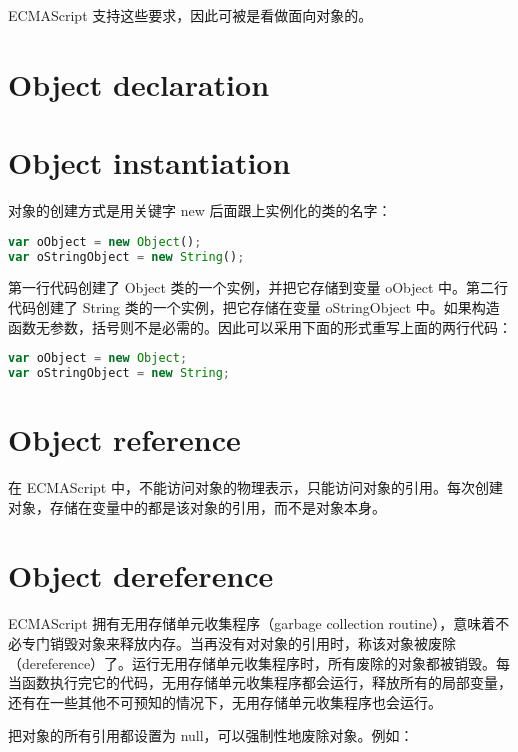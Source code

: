 ECMAScript 支持这些要求，因此可被是看做面向对象的。


\chapter{Object declaration}








\chapter{Object instantiation}


对象的创建方式是用关键字 new 后面跟上实例化的类的名字：


\begin{lstlisting}[language=JavaScript]
var oObject = new Object();
var oStringObject = new String();
\end{lstlisting}

第一行代码创建了 Object 类的一个实例，并把它存储到变量 oObject 中。第二行代码创建了 String 类的一个实例，把它存储在变量 oStringObject 中。如果构造函数无参数，括号则不是必需的。因此可以采用下面的形式重写上面的两行代码：

\begin{lstlisting}[language=JavaScript]
var oObject = new Object;
var oStringObject = new String;
\end{lstlisting}


\chapter{Object reference}


在 ECMAScript 中，不能访问对象的物理表示，只能访问对象的引用。每次创建对象，存储在变量中的都是该对象的引用，而不是对象本身。



\chapter{Object dereference}

ECMAScript 拥有无用存储单元收集程序（garbage collection routine），意味着不必专门销毁对象来释放内存。当再没有对对象的引用时，称该对象被废除（dereference）了。运行无用存储单元收集程序时，所有废除的对象都被销毁。每当函数执行完它的代码，无用存储单元收集程序都会运行，释放所有的局部变量，还有在一些其他不可预知的情况下，无用存储单元收集程序也会运行。

把对象的所有引用都设置为 null，可以强制性地废除对象。例如：

